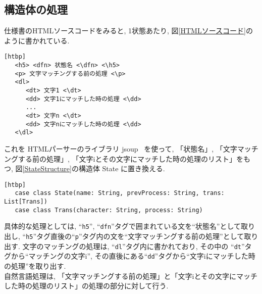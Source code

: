 \documentclass[uplatex,a4j]{jsreport}
\begin{document}
\subsection{構造体の処理}
仕様書のHTMLソースコードをみると, 1状態あたり, 図\ref{HTMLソースコード}のように書かれている. 
\begin{lstlisting}[basicstyle=\ttfamily\footnotesize, frame=single, caption=HTMLソースコード,label=HTMLソースコード][htbp]
   <h5> <dfn> 状態名 <\dfn> <\h5>
   <p> 文字マッチングする前の処理 <\p>
   <dl>
      <dt> 文字1 <\dt>
      <dd> 文字1にマッチした時の処理 <\dd>
      ...
      <dt> 文字n <\dt>
      <dd> 文字nにマッチした時の処理 <\dd>
   <\dl>
\end{lstlisting}
これを HTMLパーサーのライブラリ jsoup ~\cite{jsoup}を使って, 
「状態名」, 「文字マッチングする前の処理」, 「文字iとその文字にマッチした時の処理のリスト」をもつ, 図\ref{StateStructure}の構造体 State に置き換える. \\
\begin{lstlisting}[basicstyle=\ttfamily\footnotesize, frame=single, caption=Stateの構造体,label=StateStructure][htbp]
   case class State(name: String, prevProcess: String, trans: List[Trans])
   case class Trans(character: String, process: String)
\end{lstlisting}
具体的な処理としては, 
``\texttt{h5}'', ``\texttt{dfn}''タグで囲まれている文を``状態名''として取り出し, 
``\texttt{h5}''タグ直後の``\texttt{p}''タグ内の文を``文字マッチングする前の処理''として取り出す.
文字のマッチングの処理は, ``\texttt{dl}''タグ内に書かれており, 
その中の ``\texttt{dt}''タグから``マッチングの文字i'', その直後にある``\texttt{dd}''タグから``文字iにマッチした時の処理''を取り出す.\\
自然言語処理は, 「文字マッチングする前の処理」と「文字iとその文字にマッチした時の処理のリスト」の処理の部分に対して行う. 


\end{document}
